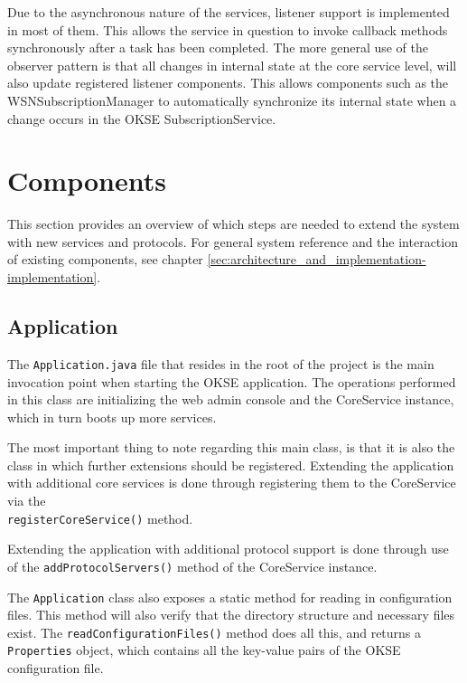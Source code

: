 Due to the asynchronous nature of the services, listener support is implemented in most of them. This allows the service in question to invoke callback methods synchronously after a task has been completed. The more general use of the observer pattern is that all changes in internal state at the core service level, will also update registered listener components. This allows components such as the WSNSubscriptionManager to automatically synchronize its internal state when a change occurs in the OKSE SubscriptionService.

\section{Components}
\label{sec:developer_manual-components}
This section provides an overview of which steps are needed to extend the system with new services and protocols. For general system reference and the interaction of existing components, see chapter \ref{sec:architecture_and_implementation-implementation}.

\subsection{Application}
\label{subsec:developer_manual-components-application}

The \verb!Application.java! file that resides in the root of the project is the main invocation point when starting the OKSE application. The operations performed in this class are initializing the web admin console and the CoreService instance, which in turn boots up more services.

The most important thing to note regarding this main class, is that it is also the class in which further extensions should be registered. Extending the application with additional core services is done through registering them to the CoreService via the \\\verb!registerCoreService()! method.

Extending the application with additional protocol support is done through use of the \verb!addProtocolServers()! method of the CoreService instance.

The \verb!Application! class also exposes a static method for reading in configuration files. This method will also verify that the directory structure and necessary files exist. The \verb!readConfigurationFiles()! method does all this, and returns a \verb!Properties! object, which contains all the key-value pairs of the OKSE configuration file.

